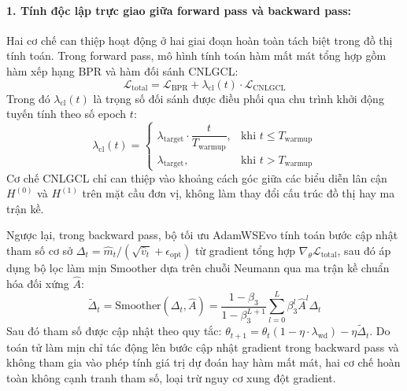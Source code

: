 \paragraph{1. Tính độc lập trực giao giữa forward pass và backward pass:}
Hai cơ chế can thiệp hoạt động ở hai giai đoạn hoàn toàn tách biệt trong đồ thị tính toán. Trong forward pass, mô hình tính toán hàm mất mát tổng hợp gồm hàm xếp hạng BPR và hàm đối sánh CNLGCL:
\begin{equation}
\mathcal{L}_{\text{total}} = \mathcal{L}_{\text{BPR}} + \lambda_{\text{cl}}(t) \cdot \mathcal{L}_{\text{CNLGCL}}
\end{equation}
Trong đó $\lambda_{\text{cl}}(t)$ là trọng số đối sánh được điều phối qua chu trình khởi động tuyến tính theo số epoch $t$:
\begin{equation}
\lambda_{\text{cl}}(t) = \begin{cases}
\lambda_{\text{target}} \cdot \dfrac{t}{T_{\text{warmup}}}, & \text{khi } t \le T_{\text{warmup}} \\[8pt]
\lambda_{\text{target}}, & \text{khi } t > T_{\text{warmup}}
\end{cases}
\end{equation}
Cơ chế CNLGCL chỉ can thiệp vào khoảng cách góc giữa các biểu diễn lân cận $H^{(0)}$ và $H^{(1)}$ trên mặt cầu đơn vị, không làm thay đổi cấu trúc đồ thị hay ma trận kề.

Ngược lại, trong backward pass, bộ tối ưu AdamWSEvo tính toán bước cập nhật tham số cơ sở $\Delta_t = \hat{m}_t / (\sqrt{\hat{v}_t} + \epsilon_{\text{opt}})$ từ gradient tổng hợp $\nabla_{\theta} \mathcal{L}_{\text{total}}$, sau đó áp dụng bộ lọc làm mịn Smoother dựa trên chuỗi Neumann qua ma trận kề chuẩn hóa đối xứng $\hat{A}$:
\begin{equation}
\tilde{\Delta}_t = \text{Smoother}(\Delta_t, \hat{A}) = \frac{1 - \beta_3}{1 - \beta_3^{L+1}} \sum_{l=0}^{L} \beta_3^l \hat{A}^l \Delta_t
\end{equation}
Sau đó tham số được cập nhật theo quy tắc: $\theta_{t+1} = \theta_t (1 - \eta \cdot \lambda_{\text{wd}}) - \eta \tilde{\Delta}_t$. Do toán tử làm mịn chỉ tác động lên bước cập nhật gradient trong backward pass và không tham gia vào phép tính giá trị dự đoán hay hàm mất mát, hai cơ chế hoàn toàn không cạnh tranh tham số, loại trừ nguy cơ xung đột gradient.

